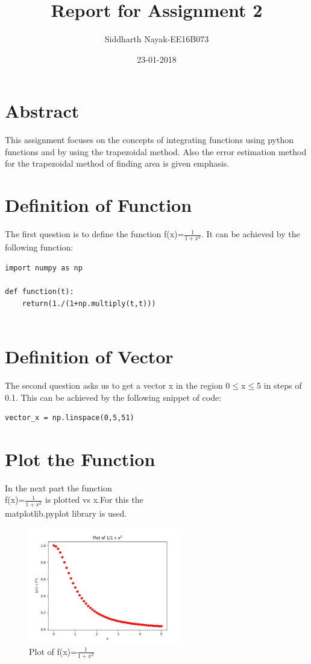 \documentclass[11pt, a3paper]{article}
\title{Report for Assignment 2}
\date{23-01-2018}
\author{Siddharth Nayak-EE16B073}
\begin{document}
\maketitle
{}
\section{Abstract}
This assignment focuses on the concepts of integrating functions using python functions and by using the trapezoidal method. Also the error estimation method for the trapezoidal method of finding area is given emphasis.

\section{Definition of Function}
The first question is to define the function f(x)=$\frac{1}{1+x^2}$.
It can be achieved by the following function:
\begin{verbatim}
import numpy as np

def function(t):
    return(1./(1+np.multiply(t,t)))
	
\end{verbatim}

\section{Definition of Vector}
The second question asks us to get a vector x in the region 0$\leq$x$\leq$5 in steps of 0.1.
This can be achieved by the following snippet of code:
\begin{verbatim}
vector_x = np.linspace(0,5,51)
\end{verbatim}

\section{Plot the Function}
In the next part the function \\ f(x)=$\frac{1}{1+x^2}$
is plotted vs x.For this the\\ {\selectfont
matplotlib.pyplot} library is used.
\begin{figure}[h!]
\includegraphics[width=0.6\textwidth, center]{Fig1.png}
\caption{Plot of f(x)=$\frac{1}{1+x^2}$}
\end{figure}
\end{document}
